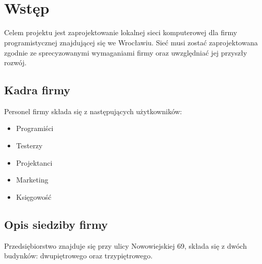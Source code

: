 \documentclass[a4paper,12pt]{extarticle}  %
\title{\tytul \\ \small{\opis}}
\author{\tworcy}
\date{\data}
\begin{document}
\maketitle
\tableofcontents
\cleardoublepage
\section{Wstęp}
Celem projektu jest zaprojektowanie lokalnej sieci komputerowej dla firmy programistycznej znajdującej się we Wrocławiu.
Sieć musi zostać zaprojektowana zgodnie ze sprecyzowanymi wymaganiami firmy oraz uwzględniać jej przyszły rozwój.
\subsection{Kadra firmy}
Personel firmy składa się z następujących użytkowników:
\begin{itemize}
	\item Programiści
	\item Testerzy
	\item Projektanci
	\item Marketing
	\item Księgowość
\end{itemize}
\subsection{Opis siedziby firmy}
Przedsiębiorstwo znajduje się przy ulicy Nowowiejskiej 69\label{address}, składa się z dwóch budynków: dwupiętrowego oraz trzypiętrowego.
\end{document}
